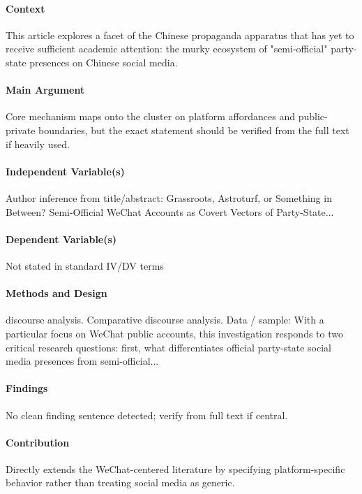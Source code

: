 \documentclass[12pt]{article}
\begin{document}
\paragraph{Context} This article explores a facet of the Chinese propaganda apparatus that has yet to receive sufficient academic attention: the murky ecosystem of "semi-official" party- state presences on Chinese social media.

\paragraph{Main Argument} Core mechanism maps onto the cluster on platform affordances and public-private boundaries, but the exact statement should be verified from the full text if heavily used.

\paragraph{Independent Variable(s)} Author inference from title/abstract: Grassroots, Astroturf, or Something in Between? Semi-Official WeChat Accounts as Covert Vectors of Party-State...

\paragraph{Dependent Variable(s)} Not stated in standard IV/DV terms

\paragraph{Methods and Design} discourse analysis. Comparative discourse analysis. Data / sample: With a particular focus on WeChat public accounts, this investigation responds to two critical research questions: first, what differentiates official party-state social media presences from semi-official...

\paragraph{Findings} No clean finding sentence detected; verify from full text if central.

\paragraph{Contribution} Directly extends the WeChat-centered literature by specifying platform-specific behavior rather than treating social media as generic.
\end{document}
